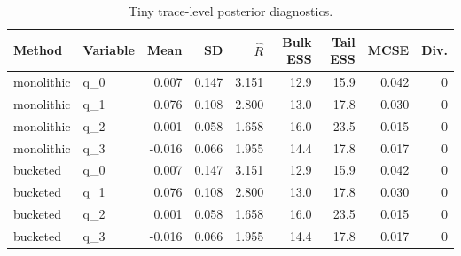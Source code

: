 \begin{table}[t]
\centering
\caption{Tiny trace-level posterior diagnostics.}
\label{tab:diagnostics}
\begin{tabular}{llrrrrrrr}
\hline
Method & Variable & Mean & SD & $\widehat{R}$ & Bulk ESS & Tail ESS & MCSE & Div. \\
\hline
monolithic & q\_0 & 0.007 & 0.147 & 3.151 & 12.9 & 15.9 & 0.042 & 0 \\
monolithic & q\_1 & 0.076 & 0.108 & 2.800 & 13.0 & 17.8 & 0.030 & 0 \\
monolithic & q\_2 & 0.001 & 0.058 & 1.658 & 16.0 & 23.5 & 0.015 & 0 \\
monolithic & q\_3 & -0.016 & 0.066 & 1.955 & 14.4 & 17.8 & 0.017 & 0 \\
bucketed & q\_0 & 0.007 & 0.147 & 3.151 & 12.9 & 15.9 & 0.042 & 0 \\
bucketed & q\_1 & 0.076 & 0.108 & 2.800 & 13.0 & 17.8 & 0.030 & 0 \\
bucketed & q\_2 & 0.001 & 0.058 & 1.658 & 16.0 & 23.5 & 0.015 & 0 \\
bucketed & q\_3 & -0.016 & 0.066 & 1.955 & 14.4 & 17.8 & 0.017 & 0 \\
\hline
\end{tabular}
\end{table}
